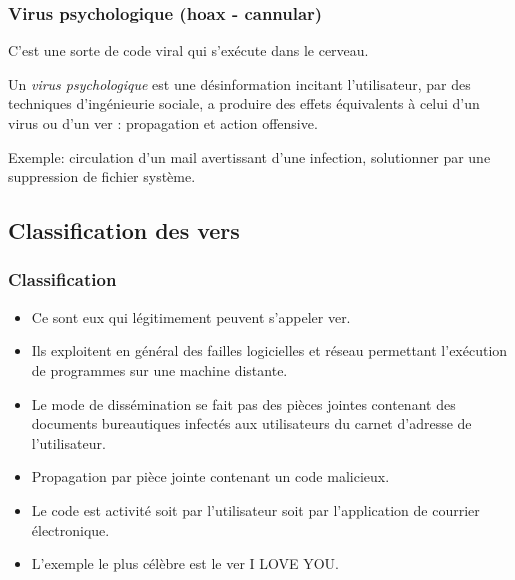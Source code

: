 \documentclass{beamer}
\newcommand{\enlight}[1]{\textit{\color{blue}#1}}
\begin{document}
\begin{frame}
\frametitle{Virus psychologique (hoax - cannular)}

C'est une sorte de code viral qui s'exécute dans le cerveau.
\bigskip

\begin{definition}\begin{itshape}
Un \enlight{virus psychologique} est une désinformation incitant l'utilisateur, par des techniques d'ingénieurie sociale, a produire des effets équivalents à celui d'un virus ou d'un ver : propagation et action offensive. 
\end{itshape}
\end{definition}

\bigskip
{\color{blue} Exemple:} circulation d'un mail avertissant d'une infection, solutionner par une suppression de fichier système.

\end{frame}




\subsection{Classification des vers}


\begin{frame}
  \frametitle{Classification}
\begin{itemize}
\item Ce sont eux qui légitimement peuvent s'appeler ver.
\item Ils exploitent en général des failles logicielles et réseau permettant l'exécution de programmes sur une machine distante.
\end{itemize}
\begin{itemize}
\item Le mode de dissémination se fait pas des pièces jointes contenant des documents bureautiques infectés aux utilisateurs du carnet d'adresse de l'utilisateur.
\end{itemize}
\begin{itemize}
\item Propagation par pièce jointe contenant un code malicieux.
\item Le code est activité soit par l'utilisateur soit par l'application de courrier électronique.
  \item L'exemple le plus célèbre est le ver I LOVE YOU.
  \end{itemize}
\end{frame}
\end{document}

